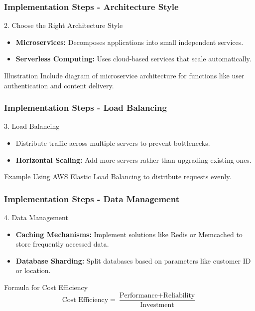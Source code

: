 \documentclass{beamer}
\begin{document}
\begin{frame}[fragile]
    \frametitle{Implementation Steps - Architecture Style}
    \begin{block}{2. Choose the Right Architecture Style}
        \begin{itemize}
            \item \textbf{Microservices:} Decomposes applications into small independent services.
            \item \textbf{Serverless Computing:} Uses cloud-based services that scale automatically.
        \end{itemize}
    \end{block}
    \begin{block}{Illustration}
        Include diagram of microservice architecture for functions like user authentication and content delivery.
    \end{block}
\end{frame}

\begin{frame}[fragile]
    \frametitle{Implementation Steps - Load Balancing}
    \begin{block}{3. Load Balancing}
        \begin{itemize}
            \item Distribute traffic across multiple servers to prevent bottlenecks.
            \item \textbf{Horizontal Scaling:} Add more servers rather than upgrading existing ones.
        \end{itemize}
        \begin{block}{Example}
            Using AWS Elastic Load Balancing to distribute requests evenly.
        \end{block}
    \end{block}
\end{frame}

\begin{frame}[fragile]
    \frametitle{Implementation Steps - Data Management}
    \begin{block}{4. Data Management}
        \begin{itemize}
            \item \textbf{Caching Mechanisms:} Implement solutions like Redis or Memcached to store frequently accessed data.
            \item \textbf{Database Sharding:} Split databases based on parameters like customer ID or location.
        \end{itemize}
    \end{block}
    \begin{block}{Formula for Cost Efficiency}
        \begin{equation}
            \text{Cost Efficiency} = \frac{\text{Performance} + \text{Reliability}}{\text{Investment}}
        \end{equation}
    \end{block}
\end{frame}
\end{document}
